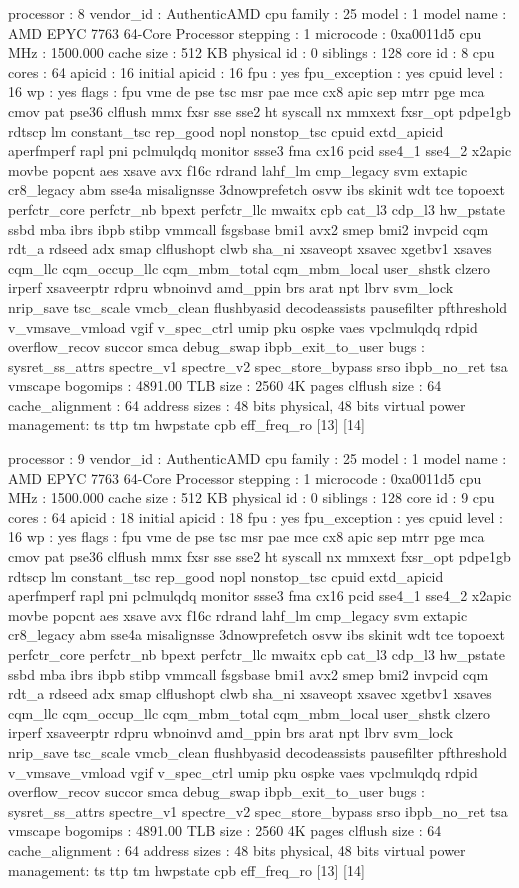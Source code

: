 processor	: 8
vendor_id	: AuthenticAMD
cpu family	: 25
model		: 1
model name	: AMD EPYC 7763 64-Core Processor
stepping	: 1
microcode	: 0xa0011d5
cpu MHz		: 1500.000
cache size	: 512 KB
physical id	: 0
siblings	: 128
core id		: 8
cpu cores	: 64
apicid		: 16
initial apicid	: 16
fpu		: yes
fpu_exception	: yes
cpuid level	: 16
wp		: yes
flags		: fpu vme de pse tsc msr pae mce cx8 apic sep mtrr pge mca cmov pat pse36 clflush mmx fxsr sse sse2 ht syscall nx mmxext fxsr_opt pdpe1gb rdtscp lm constant_tsc rep_good nopl nonstop_tsc cpuid extd_apicid aperfmperf rapl pni pclmulqdq monitor ssse3 fma cx16 pcid sse4_1 sse4_2 x2apic movbe popcnt aes xsave avx f16c rdrand lahf_lm cmp_legacy svm extapic cr8_legacy abm sse4a misalignsse 3dnowprefetch osvw ibs skinit wdt tce topoext perfctr_core perfctr_nb bpext perfctr_llc mwaitx cpb cat_l3 cdp_l3 hw_pstate ssbd mba ibrs ibpb stibp vmmcall fsgsbase bmi1 avx2 smep bmi2 invpcid cqm rdt_a rdseed adx smap clflushopt clwb sha_ni xsaveopt xsavec xgetbv1 xsaves cqm_llc cqm_occup_llc cqm_mbm_total cqm_mbm_local user_shstk clzero irperf xsaveerptr rdpru wbnoinvd amd_ppin brs arat npt lbrv svm_lock nrip_save tsc_scale vmcb_clean flushbyasid decodeassists pausefilter pfthreshold v_vmsave_vmload vgif v_spec_ctrl umip pku ospke vaes vpclmulqdq rdpid overflow_recov succor smca debug_swap ibpb_exit_to_user
bugs		: sysret_ss_attrs spectre_v1 spectre_v2 spec_store_bypass srso ibpb_no_ret tsa vmscape
bogomips	: 4891.00
TLB size	: 2560 4K pages
clflush size	: 64
cache_alignment	: 64
address sizes	: 48 bits physical, 48 bits virtual
power management: ts ttp tm hwpstate cpb eff_freq_ro [13] [14]

processor	: 9
vendor_id	: AuthenticAMD
cpu family	: 25
model		: 1
model name	: AMD EPYC 7763 64-Core Processor
stepping	: 1
microcode	: 0xa0011d5
cpu MHz		: 1500.000
cache size	: 512 KB
physical id	: 0
siblings	: 128
core id		: 9
cpu cores	: 64
apicid		: 18
initial apicid	: 18
fpu		: yes
fpu_exception	: yes
cpuid level	: 16
wp		: yes
flags		: fpu vme de pse tsc msr pae mce cx8 apic sep mtrr pge mca cmov pat pse36 clflush mmx fxsr sse sse2 ht syscall nx mmxext fxsr_opt pdpe1gb rdtscp lm constant_tsc rep_good nopl nonstop_tsc cpuid extd_apicid aperfmperf rapl pni pclmulqdq monitor ssse3 fma cx16 pcid sse4_1 sse4_2 x2apic movbe popcnt aes xsave avx f16c rdrand lahf_lm cmp_legacy svm extapic cr8_legacy abm sse4a misalignsse 3dnowprefetch osvw ibs skinit wdt tce topoext perfctr_core perfctr_nb bpext perfctr_llc mwaitx cpb cat_l3 cdp_l3 hw_pstate ssbd mba ibrs ibpb stibp vmmcall fsgsbase bmi1 avx2 smep bmi2 invpcid cqm rdt_a rdseed adx smap clflushopt clwb sha_ni xsaveopt xsavec xgetbv1 xsaves cqm_llc cqm_occup_llc cqm_mbm_total cqm_mbm_local user_shstk clzero irperf xsaveerptr rdpru wbnoinvd amd_ppin brs arat npt lbrv svm_lock nrip_save tsc_scale vmcb_clean flushbyasid decodeassists pausefilter pfthreshold v_vmsave_vmload vgif v_spec_ctrl umip pku ospke vaes vpclmulqdq rdpid overflow_recov succor smca debug_swap ibpb_exit_to_user
bugs		: sysret_ss_attrs spectre_v1 spectre_v2 spec_store_bypass srso ibpb_no_ret tsa vmscape
bogomips	: 4891.00
TLB size	: 2560 4K pages
clflush size	: 64
cache_alignment	: 64
address sizes	: 48 bits physical, 48 bits virtual
power management: ts ttp tm hwpstate cpb eff_freq_ro [13] [14]

